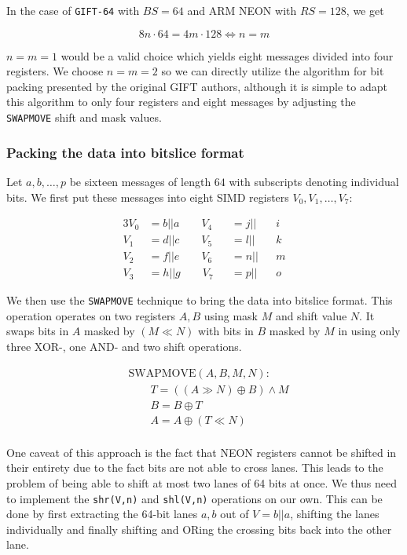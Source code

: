 In the case of \texttt{GIFT-64} with $BS=64$ and ARM NEON with $RS=128$, we get

\[
    8n\cdot 64=4m\cdot 128\Leftrightarrow n=m
\]

$n=m=1$ would be a valid choice which yields eight messages divided into four
registers. We choose $n=m=2$ so we can directly utilize the algorithm for bit
packing presented by the original GIFT authors, although it is simple to adapt
this algorithm to only four registers and eight messages by adjusting the
\texttt{SWAPMOVE} shift and mask values.

\subsubsection{Packing the data into bitslice format}

Let $a,b,\dots,p$ be sixteen messages of length $64$ with subscripts denoting
individual bits. We first put these messages into eight SIMD registers
$V_0,V_1,\dots,V_7$:

\begin{alignat*}{3}
    V_0&=b||a\qquad V_4&&=j||&&i \\
    V_1&=d||c\qquad V_5&&=l||&&k \\
    V_2&=f||e\qquad V_6&&=n||&&m \\
    V_3&=h||g\qquad V_7&&=p||&&o
\end{alignat*}

We then use the \texttt{SWAPMOVE} technique to bring the data into bitslice
format. This operation operates on two registers $A,B$ using mask $M$ and shift
value $N$. It swaps bits in $A$ masked by $(M\ll N)$ with bits in $B$ masked by
$M$ in using only three XOR-, one AND- and two shift operations.

\begin{align*}
    &\text{SWAPMOVE}(A,B,M,N): \\
    &\qquad T=((A\gg N)\oplus B)\land M \\
    &\qquad B=B\oplus T \\
    &\qquad A=A\oplus (T\ll N) \\
\end{align*}

One caveat of this approach is the fact that NEON registers cannot be shifted
in their entirety due to the fact bits are not able to cross lanes. This leads
to the problem of being able to shift at most two lanes of 64 bits at once. We
thus need to implement the \texttt{shr(V,n)} and \texttt{shl(V,n)} operations
on our own. This can be done by first extracting the 64-bit lanes $a,b$ out of
$V=b||a$, shifting the lanes individually and finally shifting and ORing the
crossing bits back into the other lane.

